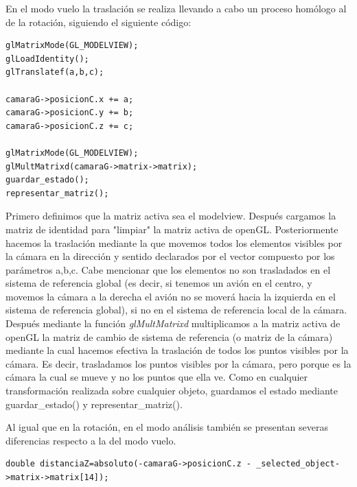 \documentclass[12pt,a4paper]{article}
\begin{document}
\begin{enumerate}
\begin{enumerate}
\begin{enumerate}
En el modo vuelo la traslación se realiza llevando a cabo un proceso homólogo al de la rotación, siguiendo el siguiente código:

\begin{lstlisting}
glMatrixMode(GL_MODELVIEW);
glLoadIdentity();
glTranslatef(a,b,c);

camaraG->posicionC.x += a;
camaraG->posicionC.y += b;
camaraG->posicionC.z += c;

glMatrixMode(GL_MODELVIEW);
glMultMatrixd(camaraG->matrix->matrix);
guardar_estado();
representar_matriz();
\end{lstlisting}
Primero definimos que la matriz activa sea el modelview. Después cargamos la matriz de identidad para "limpiar" la matriz activa de openGL. Posteriormente hacemos la traslación mediante la que movemos todos los elementos visibles por la cámara en la dirección y sentido declarados por el vector compuesto por los parámetros a,b,c. Cabe mencionar que los elementos no son trasladados en el sistema de referencia global (es decir, si tenemos un avión en el centro, y movemos la cámara a la derecha el avión no se moverá hacia la izquierda en el sistema de referencia global), si no en el sistema de referencia local de la cámara.\newline
Después mediante la función \textit{glMultMatrixd} multiplicamos a la matriz activa de openGL la matriz de cambio de sistema de referencia (o matriz de la cámara) mediante la cual hacemos efectiva la traslación de todos los puntos visibles por la cámara. Es decir, trasladamos los puntos visibles por la cámara, pero porque es la cámara la cual se mueve y no los puntos que ella ve.\newline
Como en cualquier transformación realizada sobre cualquier objeto, guardamos el estado mediante guardar\_estado() y representar\_matriz().
\newline

Al igual que en la rotación, en el modo análisis también se presentan severas diferencias respecto a la del modo vuelo.
\begin{lstlisting}
double distanciaZ=absoluto(-camaraG->posicionC.z - _selected_object->matrix->matrix[14]);


\end{lstlisting}
\end{enumerate}
\end{enumerate}
\end{enumerate}
\end{document}
